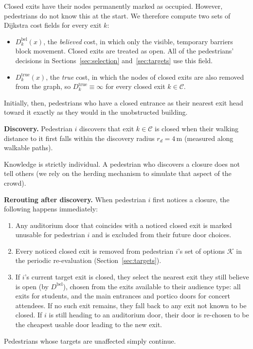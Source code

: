 \documentclass{article}
\begin{document}
Closed exits have their nodes permanently marked as
occupied. However, pedestrians do not
know this at the start. We therefore compute two sets of Dijkstra cost fields
for every exit $k$:
\begin{itemize}
    \item $D_k^{\mathrm{bel}}(x)$, the \emph{believed} cost, in which only the
    visible, temporary barriers block movement. Closed exits are treated as open.
    All of the pedestrians' decisions in Sections~\ref{sec:selection}
    and~\ref{sec:targets} use this field.
    \item $D_k^{\mathrm{true}}(x)$, the \emph{true} cost, in which the nodes of
    closed exits are also removed from the graph, so $D_k^{\mathrm{true}}\equiv\infty$
    for every closed exit $k\in\mathcal{C}$.
\end{itemize}
Initially, then, pedestrians who have a
closed entrance as their nearest exit head toward it exactly as
they would in the unobstructed building.

\textbf{Discovery.}
Pedestrian $i$ discovers that exit $k\in\mathcal{C}$ is closed when their
walking distance to it first falls within the discovery radius
$r_d = 4$\,m (measured along walkable paths).

Knowledge is strictly individual. A pedestrian who discovers a closure does not tell others (we rely on the herding mechanism to simulate that aspect of the crowd).

\textbf{Rerouting after discovery.}
When pedestrian $i$ first notices a closure, the following happens immediately:
\begin{enumerate}
    \item Any auditorium door that coincides with a noticed closed exit is
    marked unusable for pedestrian $i$ and is excluded from their future door choices.
    \item Every noticed closed exit is removed from pedestrian $i$'s set of
    options $\mathcal{K}$ in the periodic re-evaluation
    (Section~\ref{sec:targets}).
    \item If $i$'s current target exit is closed, they select the nearest exit
    they still believe is open (by $D^{\mathrm{bel}}$), chosen from the exits
    available to their audience type: all exits for students, and the main
    entrances and portico doors for concert attendees. If no such exit remains,
    they fall back to any exit not known to be closed. If $i$ is still heading to an
    auditorium door, their door is re-chosen to be the cheapest usable door
    leading to the new exit.
\end{enumerate}
Pedestrians whose targets are unaffected simply continue.
\end{document}
